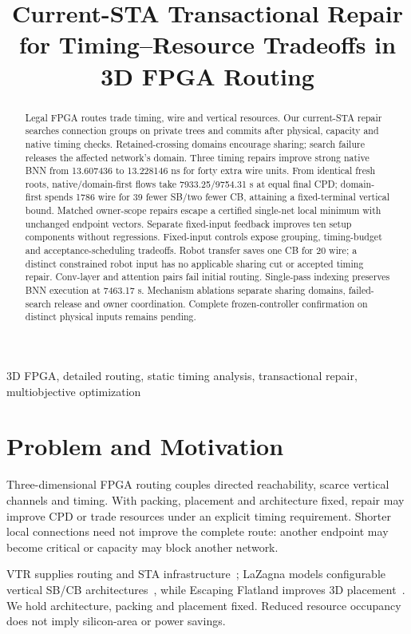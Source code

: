 \documentclass[conference,10pt]{IEEEtran}
\title{Current-STA Transactional Repair for Timing--Resource Tradeoffs in 3D FPGA Routing}
\author{\IEEEauthorblockN{Anonymous development manuscript}}
\begin{document}
\maketitle
\begin{abstract}
Legal FPGA routes trade timing, wire and vertical resources. Our current-STA repair searches connection groups on private trees and commits after physical, capacity and native timing checks. Retained-crossing domains encourage sharing; search failure releases the affected network's domain. Three timing repairs improve strong native BNN from 13.607436 to 13.228146 ns for forty extra wire units. From identical fresh roots, native/domain-first flows take 7933.25/9754.31 s at equal final CPD; domain-first spends 1786 wire for 39 fewer SB/two fewer CB, attaining a fixed-terminal vertical bound. Matched owner-scope repairs escape a certified single-net local minimum with unchanged endpoint vectors. Separate fixed-input feedback improves ten setup components without regressions. Fixed-input controls expose grouping, timing-budget and acceptance-scheduling tradeoffs. Robot transfer saves one CB for 20 wire; a distinct constrained robot input has no applicable sharing cut or accepted timing repair. Conv-layer and attention pairs fail initial routing. Single-pass indexing preserves BNN execution at 7463.17 s. Mechanism ablations separate sharing domains, failed-search release and owner coordination. Complete frozen-controller confirmation on distinct physical inputs remains pending.
\end{abstract}
\begin{IEEEkeywords}
3D FPGA, detailed routing, static timing analysis, transactional repair, multiobjective optimization
\end{IEEEkeywords}

\section{Problem and Motivation}
Three-dimensional FPGA routing couples directed reachability, scarce vertical channels and timing. With packing, placement and architecture fixed, repair may improve CPD or trade resources under an explicit timing requirement. Shorter local connections need not improve the complete route: another endpoint may become critical or capacity may block another network.

VTR supplies routing and STA infrastructure~\cite{vtr9paper}; LaZagna models configurable vertical SB/CB architectures~\cite{lazagna}, while Escaping Flatland improves 3D placement~\cite{flatland}. We hold architecture, packing and placement fixed. Reduced resource occupancy does not imply silicon-area or power savings.
\end{document}
